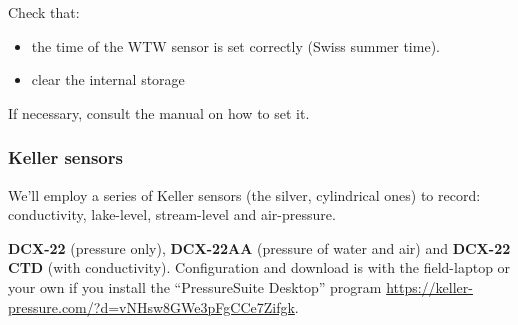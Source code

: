\documentclass[DIV=15,halfparskip,11pt,headinclude]{scrartcl}
\begin{document}
Check that:
\begin{itemize}
\item the time of the WTW sensor is set correctly (Swiss summer
time).
\item clear the internal storage
\end{itemize}
If necessary, consult the manual on how to set it.

\subsubsection{Keller sensors}
\label{s:press-trans}

We'll employ a series of Keller sensors (the silver, cylindrical ones)
to record: conductivity, lake-level, stream-level and air-pressure.

\textbf{DCX-22} (pressure only), \textbf{DCX-22AA} (pressure of water
and air) and \textbf{DCX-22 CTD} (with conductivity).  Configuration
and download is with the field-laptop or your own if you install
the ``PressureSuite Desktop''
program
\url{https://keller-pressure.com/?d=vNHsw8GWe3pFgCCe7Zifgk}.
\end{document}
